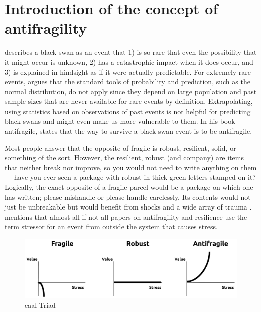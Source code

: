 \section{Introduction of the concept of antifragility}
\label{sec:introantifragility}
\textcite{Taleb2008} describes a black swan as an event that 1) is so rare that even the possibility that it might occur is unknown, 2) has a catastrophic impact when it does occur, and 3) is explained in hindsight as if it were actually predictable. For extremely rare events, \citeauthor{Taleb2008} argues that the standard tools of probability and prediction, such as the normal distribution, do not apply since they depend on large population and past sample sizes that are never available for rare events by definition. Extrapolating, using statistics based on observations of past events is not helpful for predicting black swans and might even make us more vulnerable to them. In his book \Gls{antifragile}, \textcite{Taleb2012} states that the way to survive a black swan event is to be \gls{antifragile}.

Most people answer that the opposite of \gls{fragile} is \gls{robust}, \gls{resilient}, solid, or something of the sort. However, the \gls{resilient}, \gls{robust} (and company) are items that neither break nor improve, so you would not need to write anything on them — have you ever seen a package with \gls{robust} in thick green letters stamped on it? Logically, the exact opposite of a \gls{fragile} parcel would be a package on which one has written; please mishandle or please handle carelessly. Its contents would not just be unbreakable but would benefit from shocks and a wide array of trauma \parencite{Taleb2012}. \textcite[p. 32]{Botjes2020} mentions that almost all if not all papers on antifragility and resilience use the term stressor for an event from outside the system that causes stress. 

\begin{figure}[h!]
	\centering
	\includegraphics[width=0.7\linewidth]{images/eaal-triad}
	\caption[EAAL Triad]{\acrfull{eaal} Triad \parencite{Botjes2020}}
	\label{fig:eaal-triad}
\end{figure}


